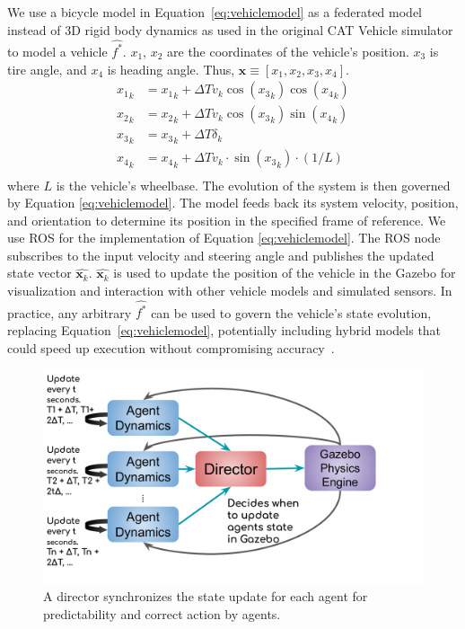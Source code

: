 \documentclass[aps,pra,twocolumn,notitlepage,nofootinbib,superscriptaddress]{revtex4-1}
\newcommand{\spliteq}[1]{\begin{equation}\begin{split}#1\end{split}\end{equation}}
\def\xbf{{\mathbf x}}
\begin{document}
We use a bicycle model in Equation~\eqref{eq:vehiclemodel} as a federated model instead of 3D rigid body dynamics as used in the original CAT Vehicle simulator to model a vehicle $\hat{f^*}$. $x_1$, $x_2$ are the coordinates of the vehicle's position. $x_3$ is tire angle, and $x_4$ is heading angle. Thus, $\xbf \equiv [x_1, x_2, x_3, x_4]$.
\spliteq{
\label{eq:vehiclemodel}
{x_1}_k & = {x_1}_k + \Delta T {v}_k  \cos({x_3}_k)\cos({x_4}_k)\\
{x_2}_k & = {x_2}_k + \Delta T {v}_k  \cos({x_3}_k)\sin({x_4}_k)\\
{x_3}_k & = {x_3}_k + \Delta T {\delta_k} \\
{x_4}_k & = {x_4}_k + \Delta T {v}_k \cdot \sin({x_3}_k)\cdot (1/L)\\
}
where $L $ is the vehicle's wheelbase. The evolution of the system is then governed by Equation \eqref{eq:vehiclemodel}. The model feeds back its system velocity, position, and orientation to determine its position in the specified frame of reference. We use ROS for the implementation of Equation \eqref{eq:vehiclemodel}. The ROS node subscribes to the input velocity and steering angle and publishes the updated state vector $\hat{\xbf_k}$. $\hat{\xbf_k}$ is used to update the position of the vehicle in the Gazebo for visualization and interaction with other vehicle models and simulated sensors. In practice, any arbitrary $\hat{f^*}$ can be used 
to govern the vehicle's state evolution, replacing Equation~\eqref{eq:vehiclemodel}, potentially including hybrid models that could speed up execution without compromising accuracy~\cite{sprinkle266}.

\begin{figure}[h]
    \centering
    \includegraphics[trim={0cm, 1.8cm, 3.2cm, 1cm}, clip,width=0.8\linewidth]{director.pdf}
    \caption{A director synchronizes the state update for each agent for predictability and correct action by agents.}
    \label{fig:director}

\end{figure}
\end{document}
